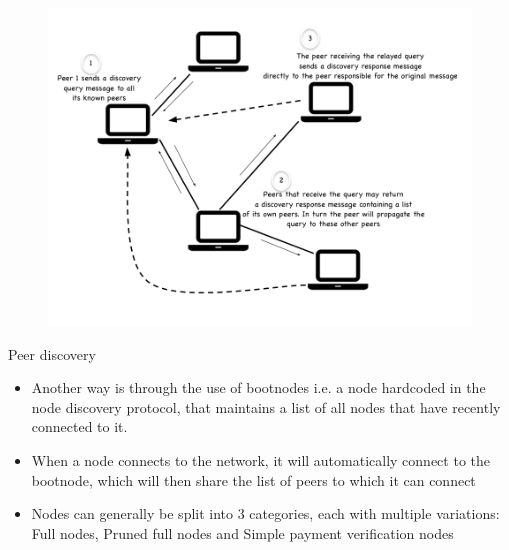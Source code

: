 \documentclass[11pt]{beamer}
\begin{document}

\begin{frame}
	\begin{figure}[]
		\centering
		\includegraphics  [scale=0.3]{Images/p2pdisc}
	\end{figure}
\end{frame}


\begin{frame}{Peer discovery}
	\begin{itemize}
		\item Another way is through the use of bootnodes i.e. a node hardcoded in the node discovery protocol, that maintains a list of all nodes that have recently connected to it.
		\item When a node connects to the network, it will automatically connect to the bootnode, which will then share the list of peers to which it can connect
		\item Nodes can generally be split into 3 categories, each with multiple variations: Full nodes, Pruned full nodes and Simple payment verification nodes
	\end{itemize}
\end{frame}

\end{document}
